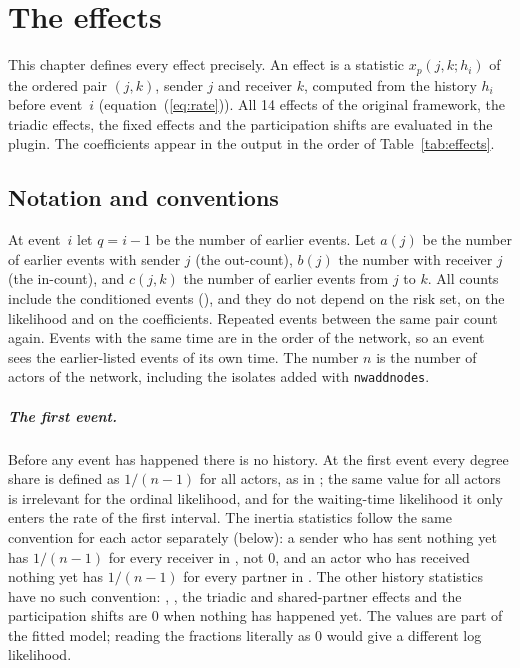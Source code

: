 \chapter{The effects}\label{ch:effects}

This chapter defines every effect precisely. An effect is a statistic $x_p(j,k;h_i)$ of the ordered pair $(j,k)$, sender $j$ and receiver $k$, computed from the history $h_i$ before event~$i$ (equation~(\ref{eq:rate})). All 14 effects of the original framework, the triadic effects, the fixed effects and the participation shifts are evaluated in the plugin. The coefficients appear in the output in the order of Table~\ref{tab:effects}.

\section{Notation and conventions}\label{sec:conventions}

At event~$i$ let $q=i-1$ be the number of earlier events. Let $a(j)$ be the number of earlier events with sender $j$ (the out-count), $b(j)$ the number with receiver $j$ (the in-count), and $c(j,k)$ the number of earlier events from $j$ to $k$. All counts include the conditioned events (), and they do not depend on the risk set, on the likelihood and on the coefficients. Repeated events between the same pair count again. Events with the same time are in the order of the network, so an event sees the earlier-listed events of its own time. The number $n$ is the number of actors of the network, including the isolates added with \texttt{nwaddnodes}.

\paragraph{The first event.} Before any event has happened there is no history. At the first event every degree share is defined as $1/(n-1)$ for all actors, as in \relevent{}; the same value for all actors is irrelevant for the ordinal likelihood, and for the waiting-time likelihood it only enters the rate of the first interval. The inertia statistics follow the same convention for each actor separately (below): a sender who has sent nothing yet has $1/(n-1)$ for every receiver in , not 0, and an actor who has received nothing yet has $1/(n-1)$ for every partner in . The other history statistics have no such convention: , , the triadic and shared-partner effects and the participation shifts are 0 when nothing has happened yet. The values are part of the fitted model; reading the fractions literally as 0 would give a different log likelihood.

